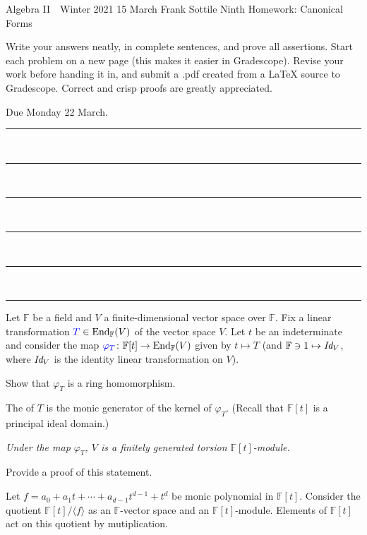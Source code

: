 \documentclass[12pt]{article}
\newcommand{\FF}{{\mathbb F}}
\newcommand{\End}{\mbox{End}}
\newcommand{\barsl}{\noindent\begin{minipage}[t]{575pt}
{\color{violet}\rule{575pt}{1.2pt}}\vspace{-5.7mm}\\
{\color{blue}\rule{575pt}{1.2pt}}\vspace{-5.7mm}\\
{\color{green}\rule{575pt}{1.2pt}}\vspace{-5.7mm}\\
{\color{yellow}\rule{575pt}{1.2pt}}\vspace{-5.7mm}\\
{\color{orange}\rule{575pt}{1.2pt}}\vspace{-5.7mm}\\
{\color{red}\rule{575pt}{1.2pt}}
\end{minipage}}
\def\demph#1{{\color{blue}{\sl #1}}}
\def\defcolor#1{{\color{blue}#1}}
\begin{document}
\LARGE 
\noindent
Algebra II\ \ Winter 2021 \hfill 15 March\makebox[20pt][l]{\ }\newline
Frank Sottile \hfill
\Large\sf
Ninth Homework: Canonical Forms\makebox[20pt][l]{\ }
\vspace{5pt}
\normalsize

\noindent
Write your answers neatly, in complete sentences, and prove all assertions.
Start each problem on a new page (this makes it easier in Gradescope).
Revise your work before handing it in, and submit a .pdf  created from a LaTeX source to Gradescope.
Correct and crisp proofs are greatly appreciated.

\noindent
{\color{red}Due Monday 22 March.}\vspace{1pt}

\barsl\medskip 


Let \defcolor{$\FF$} be a field and \defcolor{$V$} a finite-dimensional vector space over $\FF$.
Fix a linear transformation $\defcolor{T}\in\End_\FF(V)$ of the vector space $V$.
Let \defcolor{$t$} be an indeterminate and consider the map $\defcolor{\varphi_T}\colon \FF[t]\to\End_\FF(V)$ given by $t\mapsto T$
(and $\FF\ni 1\mapsto\mbox{\it Id}_V$, where \defcolor{$\mbox{\it Id}_V$} is the identity linear transformation on $V$).\medskip

\noindent
{\color{brown}{\bf Exercise 1:}} Show that $\varphi_T$ is a ring homomorphism.\medskip

\noindent
    {\color{brown}{\bf Definition.} }
    The \demph{minimal polynomial} of $T$ is the monic generator of the kernel of $\varphi_T$.
(Recall that $\FF[t]$ is a principal ideal domain.)\medskip

 {\sl Under the map  $\varphi_T$, $V$ is a finitely generated torsion $\FF[t]$-module.}

\noindent
{\color{brown}{\bf Exercise 2:}} Provide a proof of this statement.\medskip

Let $f=a_0+a_1 t +\dotsb + a_{d-1}t^{d-1} + t^d$ be monic polynomial in $\FF[t]$.
Consider the quotient $\FF[t]/\langle f\rangle$ as an $\FF$-vector space and an $\FF[t]$-module.
Elements of $\FF[t]$ act on this quotient by mutiplication.
\end{document}
